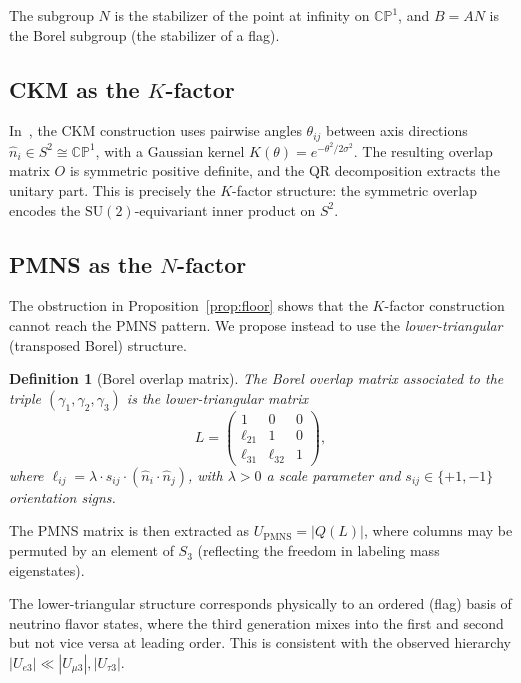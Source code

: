 \documentclass[floatfix,aps,prd,twocolumn,showpacs,superscriptaddress,longbibliography]{revtex4-2}
\newtheorem{definition}{Definition}
\newcommand{\SUtwo}{\mathrm{SU}(2)}
\newcommand{\CP}{\mathbb{CP}^1}
\begin{document}
The subgroup $N$ is the stabilizer of the point at infinity on $\CP$,
and $B = AN$ is the Borel subgroup (the stabilizer of a flag).

\subsection{CKM as the $K$-factor}

In~\cite{Gentry:CKM}, the CKM construction uses pairwise angles
$\theta_{ij}$ between axis directions $\hat{n}_i \in S^2 \cong \CP$,
with a Gaussian kernel $K(\theta) = e^{-\theta^2/2\sigma^2}$.
The resulting overlap matrix $O$ is symmetric positive definite,
and the QR decomposition extracts the unitary part. This is precisely
the $K$-factor structure: the symmetric overlap encodes the
$\SUtwo$-equivariant inner product on $S^2$.

\subsection{PMNS as the $N$-factor}

The obstruction in Proposition~\ref{prop:floor} shows that the $K$-factor
construction cannot reach the PMNS pattern. We propose instead to use
the \emph{lower-triangular} (transposed Borel) structure.

\begin{definition}[Borel overlap matrix]
\label{def:borel}
The Borel overlap matrix associated to the triple $(\gamma_1, \gamma_2, \gamma_3)$
is the lower-triangular matrix
\begin{equation}
  L = \begin{pmatrix} 1 & 0 & 0 \\ \ell_{21} & 1 & 0 \\ \ell_{31} & \ell_{32} & 1 \end{pmatrix},
  \label{eq:L_matrix}
\end{equation}
where $\ell_{ij} = \lambda \cdot s_{ij} \cdot (\hat{n}_i \cdot \hat{n}_j)$,
with $\lambda > 0$ a scale parameter and $s_{ij} \in \{+1, -1\}$ orientation signs.
\end{definition}

The PMNS matrix is then extracted as $U_\mathrm{PMNS} = |Q(L)|$, where
columns may be permuted by an element of $S_3$ (reflecting the
freedom in labeling mass eigenstates).

The lower-triangular structure corresponds physically to an ordered
(flag) basis of neutrino flavor states, where the third generation
mixes into the first and second but not vice versa at leading order.
This is consistent with the observed hierarchy $|U_{e3}| \ll |U_{\mu3}|,
|U_{\tau 3}|$.
\end{document}

